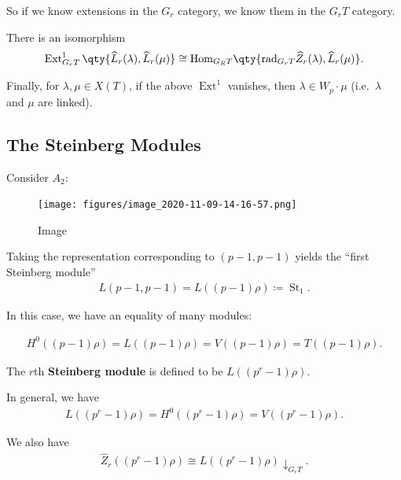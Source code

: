 So if we know extensions in the \(G_r\) category, we know them in the
\(G_r T\) category.

There is an isomorphism
\begin{align*}  
\operatorname{Ext}_{G_r T}^1 \qty{ \widehat{L}_r(\lambda), \widehat{L}_r(\mu) } 
\cong {\operatorname{Hom}}_{G_R T}\qty{ {\operatorname{rad}}_{G_r T} \widehat{Z}_r(\lambda), \widehat{L}_r(\mu) }
.\end{align*}

Finally, for \(\lambda, \mu \in X(T)\), if the above
\(\operatorname{Ext}^1\) vanishes, then \(\lambda \in W_p \cdot \mu\)
(i.e.~\(\lambda\) and \(\mu\) are linked).

\hypertarget{the-steinberg-modules}{%
\subsection{The Steinberg Modules}\label{the-steinberg-modules}}

\begin{example}[Steinberg]

Consider \(A_2\):

\begin{figure}
\centering
\texttt{[image: figures/image\_2020-11-09-14-16-57.png]}
\caption{Image}
\end{figure}

Taking the representation corresponding to \((p-1, p-1)\) yields the
``first Steinberg module''
\begin{align*}  
L(p-1, p-1) = L((p-1)\rho) \coloneqq\operatorname{St}_1 
.\end{align*}

In this case, we have an equality of many modules:

\begin{align*}  
H^0((p-1) \rho) =
L((p-1) \rho) =
V((p-1) \rho) =
T((p-1) \rho)
.\end{align*}

\end{example}

\begin{definition}

The \(r\)th \textbf{Steinberg module} is defined to be
\(L((p^r-1)\rho)\).

\end{definition}

\begin{remark}

In general, we have
\begin{align*}  
L((p^r-1)\rho) = 
H^0((p^r-1)\rho) = 
V((p^r-1)\rho)
.\end{align*}

We also have
\begin{align*}  
\widehat{Z}_r((p^r-1)\rho) \cong
L((p^r-1)\rho) \downarrow_{G_r T}
.\end{align*}

\end{remark}

